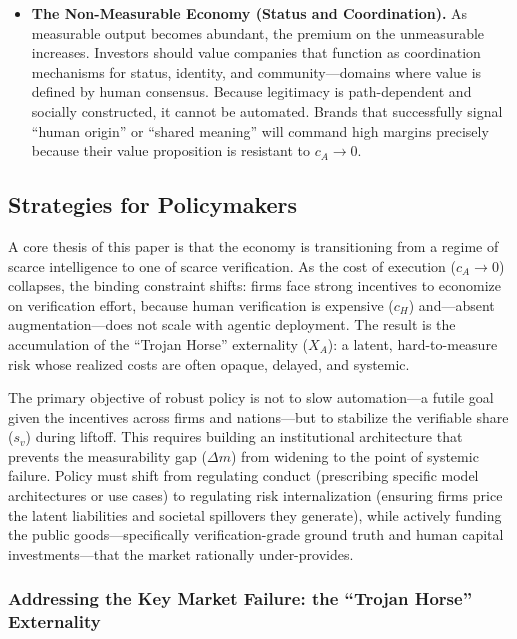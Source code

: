 \documentclass[12pt, letter]{article}
\begin{document}
\begin{itemize}
    \item \textbf{The Non-Measurable Economy (Status and Coordination).} As measurable output becomes abundant, the premium on the unmeasurable increases. Investors should value companies that function as coordination mechanisms for status, identity, and community—domains where value is defined by human consensus. Because legitimacy is path-dependent and socially constructed, it cannot be automated. Brands that successfully signal ``human origin'' or ``shared meaning'' will command high margins precisely because their value proposition is resistant to $c_A \to 0$.

\end{itemize}



\clearpage

\subsection{Strategies for Policymakers}\label{subsec:policymakers}

A core thesis of this paper is that the economy is transitioning from a regime of scarce intelligence to one of scarce verification. As the cost of execution ($c_A \to 0$) collapses, the binding constraint shifts: firms face strong incentives to economize on verification effort, because human verification is expensive ($c_H$) and—absent augmentation—does not scale with agentic deployment. The result is the accumulation of the ``Trojan Horse'' externality ($X_A$): a latent, hard-to-measure risk whose realized costs are often opaque, delayed, and systemic.

The primary objective of robust policy is not to slow automation—a futile goal given the incentives across firms and nations—but to stabilize the verifiable share ($s_v$) during liftoff. This requires building an institutional architecture that prevents the measurability gap ($\Delta m$) from widening to the point of systemic failure. Policy must shift from regulating conduct (prescribing specific model architectures or use cases) to regulating risk internalization (ensuring firms price the latent liabilities and societal spillovers they generate), while actively funding the public goods—specifically verification-grade ground truth and human capital investments—that the market rationally under-provides.

\subsubsection{Addressing the Key Market Failure: the ``Trojan Horse'' Externality}
\end{document}
